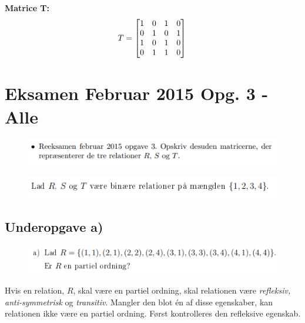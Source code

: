 \documentclass{article}
\begin{document}
\textbf{Matrice T:}\\

\[T=\begin{bmatrix}
1 & 0 & 1 & 0\\
0 & 1 & 0 & 1\\
1 & 0 & 1 & 0\\
0 & 1 & 1 & 0
\end{bmatrix}\\\]

\section{Eksamen Februar 2015 Opg. 3 - Alle}
\begin{figure}[h]
\begin{center}
\includegraphics[scale=0.9]{2015Opgave3Formulering}
\end{center}
\end{figure}
\begin{figure}[h]
\begin{center}
\includegraphics[scale=0.9]{2015Opgave3FormuleringOver}
\end{center}
\end{figure}


\subsection{Underopgave a)}
\begin{figure}[h]
\begin{center}
\includegraphics[scale=0.9]{2015Opgave3FormuleringA}
\end{center}
\end{figure}

Hvis en relation, $R$, skal være en partiel ordning, skal relationen være \emph{refleksiv, anti-symmetrisk} og \emph{transitiv}. Mangler den blot én af disse egenskaber, kan relationen ikke være en partiel ordning. Først kontrolleres den refleksive egenskab.
\end{document}

